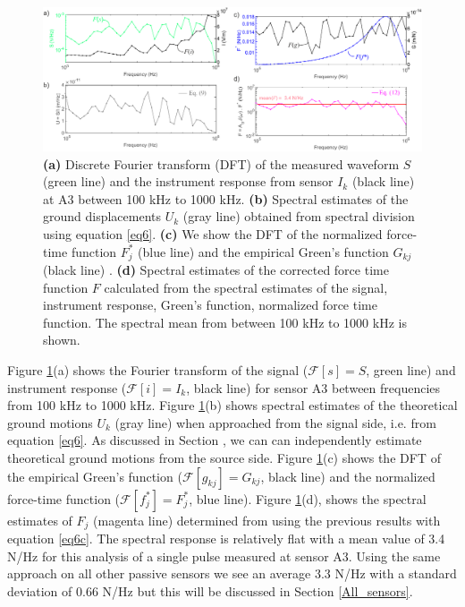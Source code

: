 \documentclass[preprint,3p, 11pt,authoryear]{elsarticle}
\begin{document}
\begin{figure}[ht]
     	\centering
\includegraphics[scale= 0.9]{FIG7.pdf} 
\caption{\textbf{(a)} Discrete Fourier transform (DFT) of the measured waveform $S$ (green line) and the instrument response from sensor $I_{k}$ (black line) at A3 between 100 kHz to 1000 kHz. \textbf{(b)} Spectral estimates of the ground displacements $U_{k}$ (gray line) obtained from spectral division using equation \eqref{eq6}. \textbf{(c)} We show the DFT of the normalized force-time function $F_{j}^{*}$ (blue line) and the empirical Green's function $G_{kj}$ (black line) . \textbf{(d)} Spectral estimates of the corrected force time function $F$ calculated from the spectral estimates of the signal, instrument response, Green's function, normalized force time function. The spectral mean from between 100 kHz to 1000 kHz is shown.}
	\label{fig7} 
\end{figure}

Figure \ref{fig7}(a) shows the Fourier transform of the signal ($\mathcal{F}[s] = S$, green line) and instrument response ($\mathcal{F}[i] = I_{k}$, black line) for sensor A3 between frequencies from 100 kHz to 1000 kHz. Figure \ref{fig7}(b) shows spectral estimates of the theoretical ground motions $U_{k}$  (gray line) when approached from the signal side, i.e. from equation \eqref{eq6}.  As discussed in Section \label{Spec_deconv}, we can can independently estimate theoretical ground motions from the source side.  Figure \ref{fig7}(c) shows the DFT of the empirical Green's function ($\mathcal{F}[g_{kj}] = G_{kj}$, black line) and the normalized force-time function ($\mathcal{F}[f^{*}_{j}] = F^{*}_{j}$, blue line). Figure \ref{fig7}(d), shows the spectral estimates of $F_{j}$ (magenta line) determined from using the previous results with equation \eqref{eq6c}.  The spectral response is relatively flat with a mean value of 3.4 N/Hz for this analysis of a single pulse measured at sensor A3.  Using the same approach on all other passive sensors we see an average 3.3 N/Hz with a standard deviation of 0.66 N/Hz but this will be discussed in Section \ref{All_sensors}. 
\end{document}
